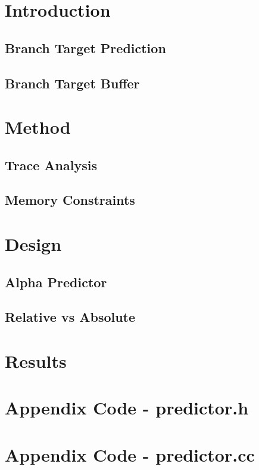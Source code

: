 \documentclass[twocolumn]{article}
\begin{document}


\section{Introduction}

\subsection{Branch Target Prediction}

\subsection{Branch Target Buffer}

\section{Method}

\subsection{Trace Analysis}

\subsection{Memory Constraints}

\section{Design}

\subsection{Alpha Predictor}

\subsection{Relative vs Absolute}

\section{Results}


\onecolumn
\section{Appendix Code - predictor.h}

\section{Appendix Code - predictor.cc}

\end{document}
